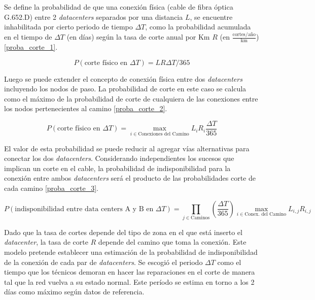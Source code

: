 Se define la probabilidad de que una conexión física (cable de fibra 
óptica G.652.D) entre 2 \emph{datacenters} separados por una distancia 
$L$, se encuentre inhabilitada por cierto periodo de tiempo $\Delta T$, 
como la probabilidad acumulada en el tiempo de $\Delta T$ (en días) 
según la tasa de corte anual por Km $R$ (en $\frac{\text{cortes}/\text{año}}{\text{km}}$) \eqref{proba_corte_1}.

\begin{equation}
\label{proba_corte_1}
P(\text{corte físico en }\Delta T) = L R \Delta T /365
\end{equation}

Luego se puede extender el concepto de conexión física entre dos 
\emph{datacenters} incluyendo los nodos de paso. La probabilidad de 
corte en este caso se calcula como el máximo de la probabilidad de 
corte de cualquiera de las conexiones entre los nodos pertenecientes al 
camino \eqref{proba_corte_2}.

\begin{equation}
\label{proba_corte_2}
P(\text{corte físico en }\Delta T) = \max_{i \in \text{Conexiones del Camino}} {L_i R_i \frac{\Delta T}{ 365}}
\end{equation}

El valor de esta probabilidad se puede reducir al agregar vías 
alternativas para conectar los dos \emph{datacenters}. Considerando 
independientes los sucesos que implican un corte en el cable, la 
probabilidad de indisponibilidad para la conexión entre ambos 
\emph{datacenters} será el producto de las probabilidades corte de cada 
camino \eqref{proba_corte_3}.

\begin{equation}
\label{proba_corte_3}
P(\text{indisponibilidad entre data centers A y B en }\Delta T) =  \prod_{j \in \text{Caminos}}\left( \frac{\Delta T}{365}\right) \max_{i \in \text{Conex. del Camino}} {L_{i,j} R_{i,j} }
\end{equation}

Dado que la tasa de cortes depende del tipo de zona en el que está 
inserto el \emph{datacenter}, la tasa de corte $R$ depende del camino 
que toma la conexión. Este modelo pretende establecer una estimación de 
la probabilidad de indisponibilidad de la conexión de cada par de 
\emph{datacenters}. Se escogió el periodo $\Delta T$ como el tiempo que 
los técnicos demoran en hacer las reparaciones en el corte de manera tal 
que la red vuelva a su estado normal. Este período se estima en torno a 
los 2 días como máximo según datos de referencia.

